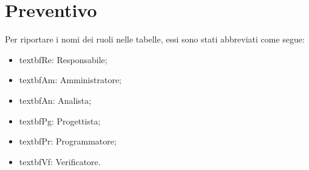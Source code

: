 \section{Preventivo}

Per riportare i nomi dei ruoli nelle tabelle, essi sono stati abbreviati come segue:
\begin{itemize}
  \item textbf{Re:} Responsabile;
  \item textbf{Am:} Amministratore;
  \item textbf{An:} Analista;
  \item textbf{Pg:} Progettista;
  \item textbf{Pr:} Programmatore;
  \item textbf{Vf:} Verificatore.
\end{itemize}






